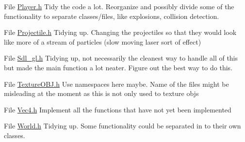 \label{todo__todo000013}
\hypertarget{todo__todo000013}{}
 
\begin{DoxyDescription}
\item[File \hyperlink{Player_8h}{Player.h} ]Tidy the code a lot. Reorganize and possibly divide some of the functionality to separate classes/files, like explosions, collision detection. 
\end{DoxyDescription}

\label{todo__todo000014}
\hypertarget{todo__todo000014}{}
 
\begin{DoxyDescription}
\item[File \hyperlink{Projectile_8h}{Projectile.h} ]Tidying up. Changing the projectiles so that they would look like more of a stream of particles (slow moving laser sort of effect) 
\end{DoxyDescription}

\label{todo__todo000015}
\hypertarget{todo__todo000015}{}
 
\begin{DoxyDescription}
\item[File \hyperlink{Sdl__gl_8h}{Sdl\_\-gl.h} ]Tidying up, not necessarily the cleanest way to handle all of this but made the main function a lot neater. Figure out the best way to do this. 
\end{DoxyDescription}

\label{todo__todo000016}
\hypertarget{todo__todo000016}{}
 
\begin{DoxyDescription}
\item[File \hyperlink{TextureOBJ_8h}{TextureOBJ.h} ]Use namespaces here maybe. Name of the files might be misleading at the moment as this is not only used to texture objs 
\end{DoxyDescription}

\label{todo__todo000009}
\hypertarget{todo__todo000009}{}
 
\begin{DoxyDescription}
\item[File \hyperlink{Vec4_8h}{Vec4.h} ]Implement all the functions that have not yet been implemented 
\end{DoxyDescription}

\label{todo__todo000017}
\hypertarget{todo__todo000017}{}
 
\begin{DoxyDescription}
\item[File \hyperlink{World_8h}{World.h} ]Tidying up. Some functionality could be separated in to their own classes. 
\end{DoxyDescription}